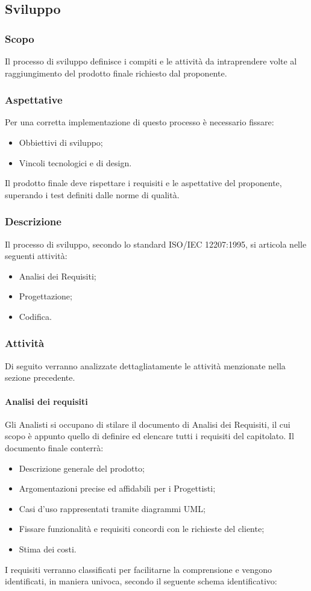 \subsection{Sviluppo}
		\subsubsection{Scopo}
			Il processo di sviluppo definisce i compiti e le attività da intraprendere volte al raggiungimento del prodotto finale richiesto dal proponente.
		\subsubsection{Aspettative}
			Per una corretta implementazione di questo processo è necessario fissare:
				\begin{itemize}
					\item Obbiettivi di sviluppo;
					\item Vincoli tecnologici e di design.
				\end{itemize}	
			Il prodotto finale deve rispettare i requisiti e le aspettative del proponente, superando i test definiti dalle norme di qualità.
		\subsubsection{Descrizione}
			Il processo di sviluppo, secondo lo standard ISO/IEC 12207:1995, si articola nelle seguenti attività:
				\begin{itemize}
					\item Analisi dei Requisiti;
					\item Progettazione;
					\item Codifica.
				\end{itemize}
		\subsubsection{Attività}
			Di seguito verranno analizzate dettagliatamente le attività menzionate nella sezione precedente.
			\paragraph{Analisi dei requisiti}
				Gli Analisti si occupano di stilare il documento di Analisi dei Requisiti, il cui scopo è appunto quello di definire ed elencare tutti i requisiti del capitolato. Il documento finale conterrà:
				\begin{itemize}
					\item Descrizione generale del prodotto;
					\item Argomentazioni precise ed affidabili per i Progettisti;
					\item Casi d'uso rappresentati tramite diagrammi UML;
					\item Fissare funzionalità e requisiti concordi con le richieste del cliente;
					\item Stima dei costi.
				\end{itemize}
				I requisiti verranno classificati per facilitarne la comprensione e vengono identificati, in maniera univoca, secondo il seguente schema identificativo:
				
